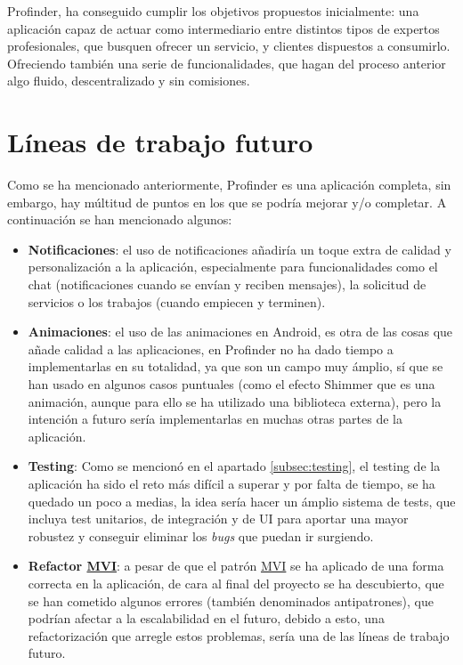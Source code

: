 Profinder, ha conseguido cumplir los objetivos propuestos inicialmente: una aplicación capaz de actuar como intermediario entre distintos tipos de expertos profesionales, que busquen ofrecer un servicio, y clientes dispuestos a consumirlo. Ofreciendo también una serie de funcionalidades, que hagan del proceso anterior algo fluido, descentralizado y sin comisiones.

\section{Líneas de trabajo futuro}
Como se ha mencionado anteriormente, Profinder es una aplicación completa, sin embargo, hay múltitud de puntos en los que se podría mejorar y/o completar. A continuación se han mencionado algunos:
\begin{itemize}
    \item \textbf{Notificaciones}: el uso de notificaciones añadiría un toque extra de calidad y personalización a la aplicación, especialmente para funcionalidades como el chat (notificaciones cuando se envían y reciben mensajes), la solicitud de servicios o los trabajos (cuando empiecen y terminen).
    \item \textbf{Animaciones}: el uso de las animaciones en Android, es otra de las cosas que añade calidad a las aplicaciones, en Profinder no ha dado tiempo a implementarlas en su totalidad, ya que son un campo muy ámplio, sí que se han usado en algunos casos puntuales (como el efecto Shimmer que es una animación, aunque para ello se ha utilizado una biblioteca externa\hyperlink{cap:biblio}{}), pero la intención a futuro sería implementarlas en muchas otras partes de la aplicación.
    \item \textbf{Testing}: Como se mencionó en el apartado \ref{subsec:testing}, el testing de la aplicación ha sido el reto más difícil a superar y por falta de tiempo, se ha quedado un poco a medias, la idea sería hacer un ámplio sistema de tests, que incluya test unitarios, de integración y de UI para aportar una mayor robustez y conseguir eliminar los \textit{bugs} que puedan ir surgiendo.
    \item \textbf{Refactor  \hyperlink{subsec:mvi}{MVI}}: a pesar de que el patrón \hyperlink{subsec:mvi}{MVI} se ha aplicado de una forma correcta en la aplicación, de cara al final del proyecto se ha descubierto, que se han cometido algunos errores (también denominados antipatrones), que podrían afectar a la escalabilidad en el futuro, debido a esto, una refactorización que arregle estos problemas, sería una de las líneas de trabajo futuro.

\end{itemize}
